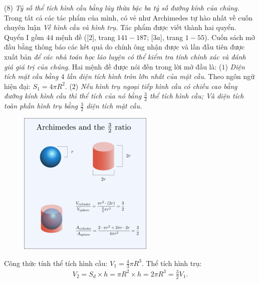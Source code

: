 \begin{multicols}{2}
	\vskip 0.1cm
	($8$) \textit{Tỷ số thể tích hình cầu bằng lũy thừa bậc ba tỷ số đường kính của chúng.}
	\vskip 0.1cm
	Trong tất cả các tác phẩm của mình, có vẻ như Archimedes tự hào nhất về cuốn chuyên luận \textit{Về hình cầu và hình trụ}. Tác phẩm được viết thành hai quyển. Quyển I gồm $44$ mệnh đề ([$2$], trang $141-187$; [$3a$], trang $1-55$). Cuốn sách mở đầu bằng thông báo các kết quả do chính ông nhận được và lần đầu tiên được xuất bản \textit{để các nhà toán học lão luyện có thể kiểm tra tính chính xác và đánh giá giá trị của chúng}. Hai mệnh đề được nói đến trong lời mở đầu là:
	\vskip 0.1cm
	($1$) \textit{Diện tích mặt cầu bằng $4$ lần diện tích hình tròn lớn nhất của mặt cầu}.
	\vskip 0.1cm
	Theo ngôn ngữ hiện đại: $S_1 = 4\pi R^2$.
	\vskip 0.1cm
	($2$) \textit{Nếu hình trụ ngoại tiếp hình cầu có chiều cao bằng đường kính hình cầu thì thể tích của nó bằng $\frac{3}{2}$ thể tích hình cầu; Và diện tích toàn phần hình trụ bằng $\frac{3}{2}$ diện tích mặt cầu.}  
	\begin{figure}[H]
		\vspace*{-5pt}
		\centering
		\captionsetup{labelformat= empty, justification=centering}
		\includegraphics[width= 0.8\linewidth]{6}
		\vspace*{-10pt}
	\end{figure}
	Công thức tính thể tích hình cầu:  ${V_1} = \frac{4}{3}\pi {R^3}$.
	\vskip 0.1cm
	Thể tích hình trụ: 
	\begin{align*}
		{V_2} = {S_d} \times h = \pi {R^2} \times h = 2\pi {R^3} = \frac{3}{2}{V_1}.

\end{align*}
\end{multicols}
